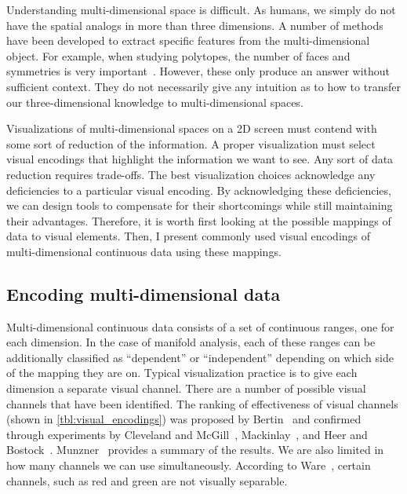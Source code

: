 Understanding multi-dimensional space is difficult. As humans, we simply do not
have the spatial analogs in more than three dimensions. A number of methods
have been developed to extract specific features from the multi-dimensional
object. For example, when studying polytopes, the number of faces and
symmetries is very important~\cite{Ziegler:2012}. However, these only produce
an answer without sufficient context. They do not necessarily give any
intuition as to how to transfer our three-dimensional knowledge to
multi-dimensional spaces.

Visualizations of multi-dimensional spaces on a 2D screen must contend with
some sort of reduction of the information. A proper visualization must select
visual encodings that highlight the information we want to see. Any sort of
data reduction requires trade-offs. The best visualization choices acknowledge
any deficiencies to a particular visual encoding. By acknowledging these
deficiencies, we can design tools to compensate for their shortcomings while
still maintaining their advantages. Therefore, it is worth first looking at the
possible mappings of data to visual elements. Then, I present commonly used
visual encodings of multi-dimensional continuous data using these mappings.

\subsection{Encoding multi-dimensional data}

Multi-dimensional continuous data consists of a set of continuous ranges, one
for each dimension. In the case of manifold analysis, each of these ranges can
be additionally classified as ``dependent'' or ``independent'' depending on
which side of the mapping they are on. Typical visualization practice is to
give each dimension a separate visual channel. There are a number of possible
visual channels that have been identified.  The ranking of effectiveness of
visual channels (shown in \autoref{tbl:visual_encodings}) was proposed by
Bertin~\cite{Bertin:1967} and confirmed through experiments by Cleveland and
McGill~\cite{Cleveland:1984}, Mackinlay~\cite{Mackinlay:1986}, and Heer and
Bostock~\cite{Heer:2010}.  Munzner~\cite{Munzner:2014} provides a summary of
the results. We are also limited in how many channels we can use
simultaneously. According to Ware~\cite{Ware:2004}, certain channels, such as
red and green are not visually separable. 


